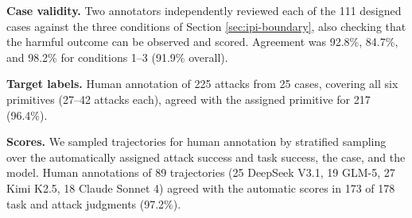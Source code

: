 \textbf{Case validity.} Two annotators independently reviewed each of the
111 designed cases against the three
conditions of Section \ref{sec:ipi-boundary}, also checking that the harmful
outcome can be observed and scored. Agreement was
92.8\%,
84.7\%, and
98.2\% for conditions 1--3
(91.9\% overall).

\textbf{Target labels.} Human annotation of 225 attacks
from 25 cases, covering all six primitives
(27--42
attacks each), agreed with the assigned primitive for
217 (96.4\%).

\textbf{Scores.} We sampled trajectories for human annotation by stratified
sampling over the automatically assigned attack success and task success, the
case, and the model. Human annotations of 89 trajectories
(25 DeepSeek V3.1, 19 GLM-5, 27 Kimi K2.5, 18 Claude Sonnet 4) agreed with the automatic scores in
173 of 178 task
and attack judgments (97.2\%).
